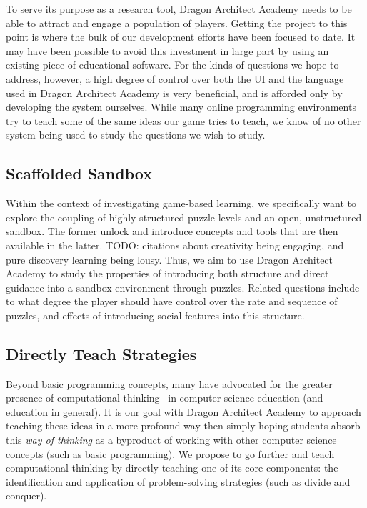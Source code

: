 \documentclass{sig-alternate}
\newcommand{\TODO}[1]{{\color{red} TODO: #1}}
\newcommand{\gametitle}{{\color{RoyalPurple} Dragon Architect Academy}}
\begin{document}
To serve its purpose as a research tool, \gametitle{} needs to be able to attract and engage a population of players. Getting the project to this point is where the bulk of our development efforts have been focused to date. It may have been possible to avoid this investment in large part by using an existing piece of educational software. For the kinds of questions we hope to address, however, a high degree of control over both the UI and the language used in \gametitle{} is very beneficial, and is afforded only by developing the system ourselves. While many online programming environments try to teach some of the same ideas our game tries to teach, we know of no other system being used to study the questions we wish to study. 

\subsection{Scaffolded Sandbox}
Within the context of investigating game-based learning, we specifically want to explore the coupling of highly structured puzzle levels and an open, unstructured sandbox. The former unlock and introduce concepts and tools that are then available in the latter. \TODO{citations about creativity being engaging, and pure discovery learning being lousy}. Thus, we aim to use \gametitle{} to study the properties of introducing both structure and direct guidance into a sandbox environment through puzzles. Related questions include to what degree the player should have control over the rate and sequence of puzzles, and effects of introducing social features into this structure. 

\subsection{Directly Teach Strategies}

Beyond basic programming concepts, many have advocated for the greater presence of computational thinking~\cite{wing2008computational} in computer science education (and education in general). It is our goal with \gametitle{} to approach teaching these ideas in a more profound way then simply hoping students absorb this \emph{way of thinking} as a byproduct of working with other computer science concepts (such as basic programming). We propose to go further and teach computational thinking by directly teaching one of its core components: the identification and application of problem-solving strategies (such as divide and conquer). 
\end{document}
